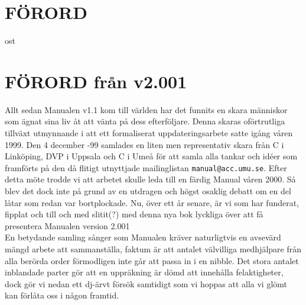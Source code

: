 \documentclass[a6paper,fontsize=10pt,twoside,openright]{scrbook}
\begin{document}
\section{FÖRORD}\vspace{10pt}
\hspace{\indent} ost
\newpage
\section{FÖRORD från v2.001}\vspace{10pt}
\hspace{\indent}Allt sedan Manualen v1.1 kom till världen har det
funnits en skara människor som ägnat sina liv åt att vänta på dess
efterföljare. Denna skaras oförtrutliga tillväxt utmynnande i att ett
formaliserat uppdateringsarbete satte igång våren 1999. Den 4 december
-99 samlades en liten men representativ skara från C i Linköping, DVP
i Uppsala och C i Umeå för att samla alla tankar och idéer som
framförts på den då flitigt utnyttjade mailinglistan
\texttt{manual@acc.umu.se}. Efter detta möte trodde vi att arbetet
skulle leda till en färdig Manual våren 2000. Så blev det dock inte på
grund av en utdragen och högst osaklig debatt om en del låtar som
redan var bortplockade. Nu, över ett år senare, är vi som har
funderat, fipplat och till och med slitit(?) med denna nya bok
lyckliga över att få presentera Manualen version 2.001\\ \indent En
betydande samling sånger som Manualen kräver naturligtvis en avsevärd
mängd arbete att sammanställa, faktum är att antalet välvilliga
medhjälpare från alla berörda order förmodligen inte går att passa in
i en nibble. Det stora antalet inblandade parter gör att en uppräkning
är dömd att innehålla felaktigheter, dock gör vi nedan ett dj-ärvt
försök samtidigt som vi hoppas att alla vi glömt kan förlåta oss i
någon framtid.
\newpage
\end{document}
